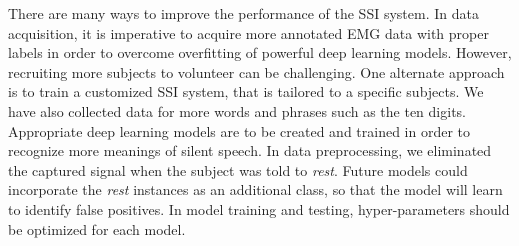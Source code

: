 \documentclass{article}
\begin{document}
There are many ways to  improve the performance of the SSI system. In data acquisition, it is imperative to acquire more annotated EMG data with proper labels in order to overcome overfitting of powerful deep learning models. However, recruiting more subjects to volunteer can be challenging. One alternate approach is to train a customized SSI system, that is tailored to a specific subjects.  We have also collected data for more words and phrases such as the ten digits. Appropriate deep learning models are to be created and trained in order to recognize more meanings of silent speech.  In data preprocessing,  we eliminated the captured signal when the subject was told to \textit{rest}. Future models could incorporate the \textit{rest} instances as an additional class, so that the model will learn to identify false positives. In model training and testing, hyper-parameters should be optimized for each model. 








\end{document}
